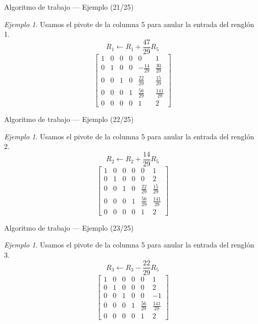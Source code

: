 \documentclass[aspectratio=169,11pt]{beamer}
\theoremstyle{remark}
\newtheorem{Ejem}[definicion]{Ejemplo}
\begin{document}
\begin{frame}{Algoritmo de trabajo — Ejemplo (21/25)}
\begin{Ejem}
Usamos el pivote de la columna 5 para anular la entrada del renglón 1.
\[
R_{1}\leftarrow R_{1}+\frac{47}{29}R_{5}
\]
\[
\left[\begin{array}{ccccc|c}
1 & 0 & 0 & 0 & 0 & 1\\
0 & 1 & 0 & 0 & - \frac{14}{29} & \frac{30}{29}\\
0 & 0 & 1 & 0 & \frac{22}{29} & \frac{15}{29}\\
0 & 0 & 0 & 1 & \frac{56}{29} & \frac{141}{29}\\
0 & 0 & 0 & 0 & 1 & 2
\end{array}\right]
\]
\end{Ejem}
\end{frame}

\begin{frame}{Algoritmo de trabajo — Ejemplo (22/25)}
\begin{Ejem}
Usamos el pivote de la columna 5 para anular la entrada del renglón 2.
\[
R_{2}\leftarrow R_{2}+\frac{14}{29}R_{5}
\]
\[
\left[\begin{array}{ccccc|c}
1 & 0 & 0 & 0 & 0 & 1\\
0 & 1 & 0 & 0 & 0 & 2\\
0 & 0 & 1 & 0 & \frac{22}{29} & \frac{15}{29}\\
0 & 0 & 0 & 1 & \frac{56}{29} & \frac{141}{29}\\
0 & 0 & 0 & 0 & 1 & 2
\end{array}\right]
\]
\end{Ejem}
\end{frame}

\begin{frame}{Algoritmo de trabajo — Ejemplo (23/25)}
\begin{Ejem}
Usamos el pivote de la columna 5 para anular la entrada del renglón 3.
\[
R_{3}\leftarrow R_{3}-\frac{22}{29}R_{5}
\]
\[
\left[\begin{array}{ccccc|c}
1 & 0 & 0 & 0 & 0 & 1\\
0 & 1 & 0 & 0 & 0 & 2\\
0 & 0 & 1 & 0 & 0 & -1\\
0 & 0 & 0 & 1 & \frac{56}{29} & \frac{141}{29}\\
0 & 0 & 0 & 0 & 1 & 2
\end{array}\right]
\]
\end{Ejem}
\end{frame}
\end{document}
